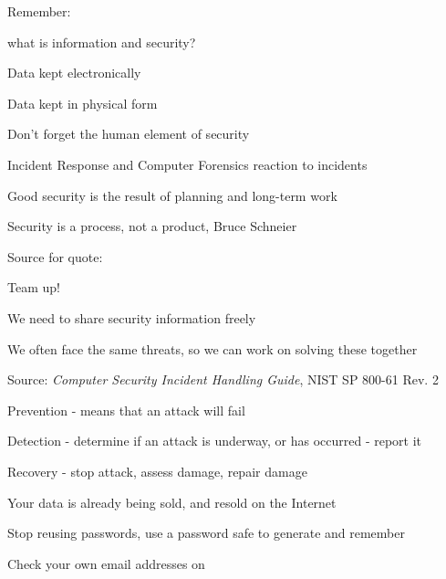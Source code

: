 \documentclass[Screen16to9,17pt]{foils}
\begin{document}
\begin{list1}
\item Remember:
\begin{list2}
\item what is information and security?
\item Data kept electronically
\item Data kept in physical form
\item Don't forget the human element of security
\end{list2}
\item Incident Response and Computer Forensics reaction to incidents
\item Good security is the result of planning and long-term work
\end{list1}
\vskip 1cm
\centerline{\color{titlecolor}\LARGE Security is a process, not a product, Bruce Schneier}

Source for quote: 




\begin{list1}
\item Team up!
\item We need to share security information freely
\item We often face the same threats, so we can work on solving these together
\end{list1}


{\footnotesize Source: \emph{Computer Security Incident Handling Guide}, NIST SP 800-61 Rev. 2}


\begin{list1}
\item Prevention - means that an attack will fail
\item Detection - determine if an attack is underway, or has occurred - report it
\item Recovery - stop attack, assess damage, repair damage
\end{list1}




\begin{list1}
\item Your data is already being sold, and resold on the Internet
\item Stop reusing passwords, use a password safe to generate and remember
\item Check your own email addresses on 
\end{list1}
\end{document}
